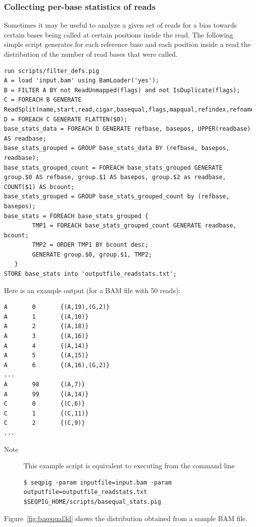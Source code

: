 \subsubsection{Collecting per-base statistics of reads}
Sometimes it may be useful to analyze a given set of reads for a bias
towards certain bases being called at certain positions inside the
read. The following simple script generates for each reference base and
each position inside a read the distribution of the number of read bases
that were called.
\begin{lstlisting}
run scripts/filter_defs.pig
A = load 'input.bam' using BamLoader('yes');
B = FILTER A BY not ReadUnmapped(flags) and not IsDuplicate(flags);
C = FOREACH B GENERATE ReadSplit(name,start,read,cigar,basequal,flags,mapqual,refindex,refname,attributes#'MD');
D = FOREACH C GENERATE FLATTEN($0);
base_stats_data = FOREACH D GENERATE refbase, basepos, UPPER(readbase) AS readbase;
base_stats_grouped = GROUP base_stats_data BY (refbase, basepos, readbase);
base_stats_grouped_count = FOREACH base_stats_grouped GENERATE group.$0 AS refbase, group.$1 AS basepos, group.$2 as readbase, COUNT($1) AS bcount;
base_stats_grouped = GROUP base_stats_grouped_count by (refbase, basepos);
base_stats = FOREACH base_stats_grouped {
        TMP1 = FOREACH base_stats_grouped_count GENERATE readbase, bcount;
        TMP2 = ORDER TMP1 BY bcount desc;
        GENERATE group.$0, group.$1, TMP2;
   }
STORE base_stats into 'outputfile_readstats.txt';
\end{lstlisting}
Here is an example output (for a BAM file with 50 reads):
\begin{lstlisting}
A       0       {(A,19),(G,2)}
A       1       {(A,10)}
A       2       {(A,18)}
A       3       {(A,16)}
A       4       {(A,14)}
A       5       {(A,15)}
A       6       {(A,16),(G,2)}
...
A       98      {(A,7)}
A       99      {(A,14)}
C       0       {(C,6)}
C       1       {(C,11)}
C       2       {(C,9)}
...
\end{lstlisting}
\begin{description}
	\item[Note] This example script is equivalent to executing from the command line
\begin{lstlisting}
$ seqpig -param inputfile=input.bam -param outputfile=outputfile_readstats.txt $SEQPIG_HOME/scripts/basequal_stats.pig
\end{lstlisting}
\end{description}
Figure~\ref{fig:basequal3d} shows the distribution obtained from a sample BAM file.

